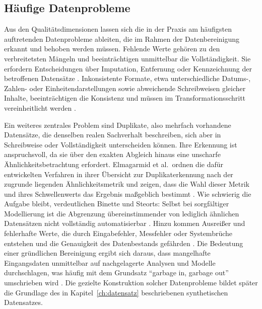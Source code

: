 \subsection{Häufige Datenprobleme}
\label{subsec:dq-probleme}

Aus den Qualitätsdimensionen lassen sich die in der Praxis am häufigsten auftretenden Datenprobleme ableiten, die im Rahmen der Datenbereinigung erkannt und behoben werden müssen. Fehlende Werte gehören zu den verbreitetsten Mängeln und beeinträchtigen unmittelbar die Vollständigkeit. Sie erfordern Entscheidungen über Imputation, Entfernung oder Kennzeichnung der betroffenen Datensätze \autocite{coteDataCleaningMachine2024,rangineniReviewEnhancingData2023}. Inkonsistente Formate, etwa unterschiedliche Datums-, Zahlen- oder Einheitendarstellungen sowie abweichende Schreibweisen gleicher Inhalte, beeinträchtigen die Konsistenz und müssen im Transformationsschritt vereinheitlicht werden \autocite{rangineniReviewEnhancingData2023,ridzuanReviewDataQuality2024}.

Ein weiteres zentrales Problem sind Duplikate, also mehrfach vorhandene Datensätze, die denselben realen Sachverhalt beschreiben, sich aber in Schreibweise oder Vollständigkeit unterscheiden können. Ihre Erkennung ist anspruchsvoll, da sie über den exakten Abgleich hinaus eine unscharfe Ähnlichkeitsbetrachtung erfordert. Elmagarmid et al.\ ordnen die dafür entwickelten Verfahren in ihrer Übersicht zur Duplikaterkennung nach der zugrunde liegenden Ähnlichkeitsmetrik und zeigen, dass die Wahl dieser Metrik und ihres Schwellenwerts das Ergebnis maßgeblich bestimmt \autocite{elmagarmidDuplicateRecordDetection2007}. Wie schwierig die Aufgabe bleibt, verdeutlichen Binette und Steorts: Selbst bei sorgfältiger Modellierung ist die Abgrenzung übereinstimmender von lediglich ähnlichen Datensätzen nicht vollständig automatisierbar \autocite{binetteAlmostAllEntity2022,coteDataCleaningMachine2024}. Hinzu kommen Ausreißer und fehlerhafte Werte, die durch Eingabefehler, Messfehler oder Systembrüche entstehen und die Genauigkeit des Datenbestands gefährden \autocite{coteDataCleaningMachine2024,rangineniReviewEnhancingData2023}. Die Bedeutung einer gründlichen Bereinigung ergibt sich daraus, dass mangelhafte Eingangsdaten unmittelbar auf nachgelagerte Analysen und Modelle durchschlagen, was häufig mit dem Grundsatz \enquote{garbage in, garbage out} umschrieben wird \autocite{ridzuanReviewDataQuality2024,rangineniReviewEnhancingData2023}. Die gezielte Konstruktion solcher Datenprobleme bildet später die Grundlage des in Kapitel~\ref{ch:datensatz} beschriebenen synthetischen Datensatzes.

